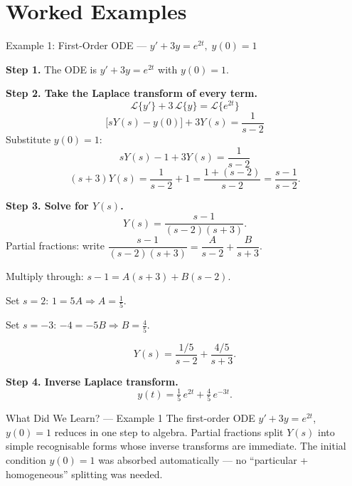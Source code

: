 \documentclass[12pt,a4paper]{article}
\begin{document}
\section{Worked Examples}

\begin{infobox}{Example 1: First-Order ODE --- \(y' + 3y = e^{2t},\; y(0)=1\)}

\textbf{Step 1.} The ODE is \(y' + 3y = e^{2t}\) with \(y(0)=1\).

\textbf{Step 2. Take the Laplace transform of every term.}
\[
  \mathcal{L}\{y'\} + 3\,\mathcal{L}\{y\} = \mathcal{L}\{e^{2t}\}
\]
\[
  \bigl[sY(s) - y(0)\bigr] + 3Y(s) = \frac{1}{s-2}
\]
Substitute \(y(0)=1\):
\[
  sY(s) - 1 + 3Y(s) = \frac{1}{s-2}
\]
\[
  (s+3)Y(s) = \frac{1}{s-2} + 1 = \frac{1 + (s-2)}{s-2} = \frac{s-1}{s-2}.
\]

\textbf{Step 3. Solve for \(Y(s)\).}
\[
  Y(s) = \frac{s-1}{(s-2)(s+3)}.
\]
Partial fractions: write \(\dfrac{s-1}{(s-2)(s+3)} = \dfrac{A}{s-2} + \dfrac{B}{s+3}\).

Multiply through: \(s-1 = A(s+3) + B(s-2)\).

Set \(s=2\): \(1 = 5A \Rightarrow A = \tfrac{1}{5}\).

Set \(s=-3\): \(-4 = -5B \Rightarrow B = \tfrac{4}{5}\).

\[
  Y(s) = \frac{1/5}{s-2} + \frac{4/5}{s+3}.
\]

\textbf{Step 4. Inverse Laplace transform.}
\[
  y(t) = \tfrac{1}{5}\,e^{2t} + \tfrac{4}{5}\,e^{-3t}.
\]
\end{infobox}

\begin{learnbox}{What Did We Learn? --- Example 1}
The first-order ODE \(y'+3y=e^{2t}\), \(y(0)=1\) reduces in one step to algebra.
Partial fractions split \(Y(s)\) into simple recognisable forms whose inverse transforms
are immediate.
The initial condition \(y(0)=1\) was absorbed automatically --- no ``particular + homogeneous''
splitting was needed.
\end{learnbox}
\end{document}
